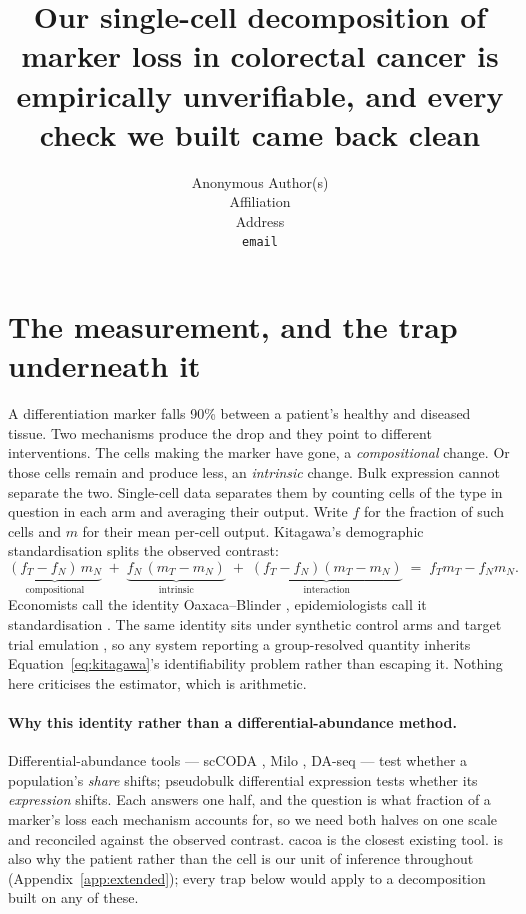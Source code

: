 \documentclass{article}
\title{Our single-cell decomposition of marker loss in colorectal cancer is
empirically unverifiable, and every check we built came back clean}
\author{%
  Anonymous Author(s) \\
  Affiliation \\
  Address \\
  \texttt{email} \\
}
\begin{document}
\maketitle



\section{The measurement, and the trap underneath it}
\label{sec:intro}

A differentiation marker falls 90\% between a patient's healthy and diseased
tissue. Two mechanisms produce the drop and they point to different
interventions. The cells making the marker have gone, a \emph{compositional}
change. Or those cells remain and produce less, an \emph{intrinsic} change. Bulk
expression cannot separate the two. Single-cell data separates them by counting
cells of the type in question in each arm and averaging their output. Write $f$
for the fraction of such cells and $m$ for their mean per-cell output. Kitagawa's
demographic standardisation \citep{kitagawa1955} splits the observed contrast:
\begin{equation}
\underbrace{(f_T - f_N)\, m_N}_{\text{compositional}} \;+\;
\underbrace{f_N\, (m_T - m_N)}_{\text{intrinsic}} \;+\;
\underbrace{(f_T - f_N)(m_T - m_N)}_{\text{interaction}}
\;=\; f_T m_T - f_N m_N .
\label{eq:kitagawa}
\end{equation}
Economists call the identity Oaxaca--Blinder \citep{oaxaca1973,blinder1973},
epidemiologists call it standardisation \citep{kline2011}. The same identity sits
under synthetic control arms \citep{abadie2010} and target trial emulation
\citep{hernan2016}, so any system reporting a group-resolved quantity inherits
Equation~\ref{eq:kitagawa}'s identifiability problem rather than escaping it.
Nothing here criticises the estimator, which is arithmetic.

\paragraph{Why this identity rather than a differential-abundance method.}
Differential-abundance tools --- scCODA \citep{buettner2021}, Milo
\citep{dann2022}, DA-seq \citep{zhao2021} --- test whether a population's
\emph{share} shifts; pseudobulk differential expression
\citep{crowell2020,squair2021} tests whether its \emph{expression} shifts. Each
answers one half, and the question is what fraction of a marker's loss each
mechanism accounts for, so we need both halves on one scale and reconciled
against the observed contrast. cacoa \citep{petukhov2022} is the closest existing
tool. \citet{squair2021} is also why the patient rather than the cell is our unit
of inference throughout (Appendix~\ref{app:extended}); every trap below would
apply to a decomposition built on any of these.
\end{document}
